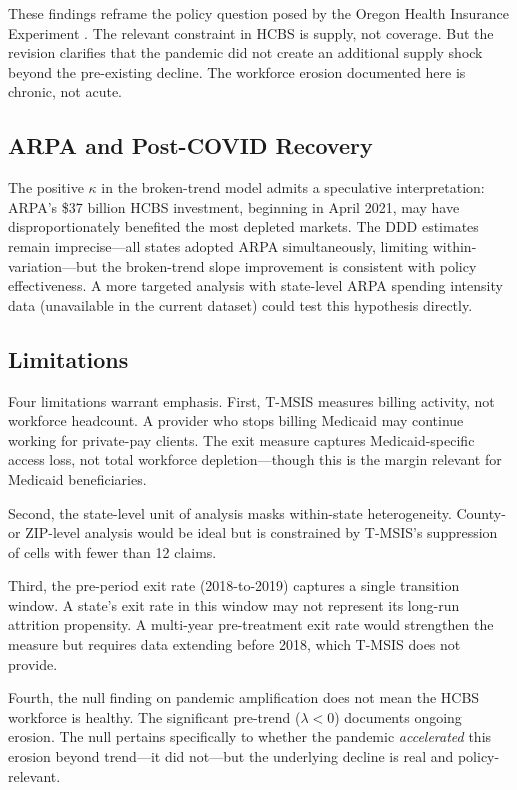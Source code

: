 \documentclass[12pt]{article}
\begin{document}
These findings reframe the policy question posed by the Oregon Health Insurance Experiment \citep{finkelstein2012,baicker2013}. The relevant constraint in HCBS is supply, not coverage. But the revision clarifies that the pandemic did not create an additional supply shock beyond the pre-existing decline. The workforce erosion documented here is chronic, not acute.

\subsection{ARPA and Post-COVID Recovery}

The positive $\kappa$ in the broken-trend model admits a speculative interpretation: ARPA's \$37 billion HCBS investment, beginning in April 2021, may have disproportionately benefited the most depleted markets. The DDD estimates remain imprecise---all states adopted ARPA simultaneously, limiting within-variation---but the broken-trend slope improvement is consistent with policy effectiveness. A more targeted analysis with state-level ARPA spending intensity data (unavailable in the current dataset) could test this hypothesis directly.

\subsection{Limitations}

Four limitations warrant emphasis. First, T-MSIS measures billing activity, not workforce headcount. A provider who stops billing Medicaid may continue working for private-pay clients. The exit measure captures Medicaid-specific access loss, not total workforce depletion---though this is the margin relevant for Medicaid beneficiaries.

Second, the state-level unit of analysis masks within-state heterogeneity. County- or ZIP-level analysis would be ideal but is constrained by T-MSIS's suppression of cells with fewer than 12 claims.

Third, the pre-period exit rate (2018-to-2019) captures a single transition window. A state's exit rate in this window may not represent its long-run attrition propensity. A multi-year pre-treatment exit rate would strengthen the measure but requires data extending before 2018, which T-MSIS does not provide.

Fourth, the null finding on pandemic amplification does not mean the HCBS workforce is healthy. The significant pre-trend ($\lambda < 0$) documents ongoing erosion. The null pertains specifically to whether the pandemic \textit{accelerated} this erosion beyond trend---it did not---but the underlying decline is real and policy-relevant.
\end{document}
